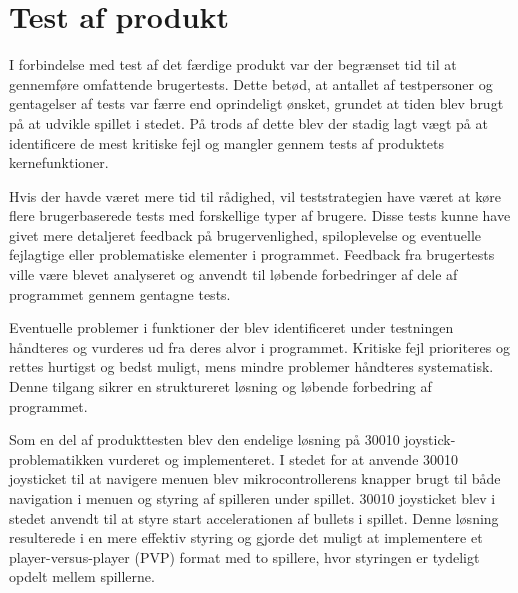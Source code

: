 \section{Test af produkt}
\vspace{0.5em}
I forbindelse med test af det færdige produkt var der begrænset tid til at gennemføre omfattende brugertests. Dette betød, at antallet af testpersoner og gentagelser af tests var færre end oprindeligt ønsket, grundet at tiden blev brugt på at udvikle spillet i stedet. På trods af dette blev der stadig lagt vægt på at identificere de mest kritiske fejl og mangler gennem tests af produktets kernefunktioner.

Hvis der havde været mere tid til rådighed, vil teststrategien have været at køre flere brugerbaserede tests med forskellige typer af brugere. Disse tests kunne have givet mere detaljeret feedback på brugervenlighed, spiloplevelse og eventuelle fejlagtige eller problematiske elementer i programmet. Feedback fra brugertests ville være blevet analyseret og anvendt til løbende forbedringer af dele af programmet gennem gentagne tests.

Eventuelle problemer i funktioner der blev identificeret under testningen håndteres og vurderes ud fra deres alvor i programmet. Kritiske fejl prioriteres og rettes hurtigst og bedst muligt, mens mindre problemer håndteres systematisk. Denne tilgang sikrer en struktureret løsning og løbende forbedring af programmet.

Som en del af produkttesten blev den endelige løsning på 30010 joystick-problematikken vurderet og implementeret. I stedet for at anvende 30010 joysticket til at navigere menuen blev mikrocontrollerens knapper brugt til både navigation i menuen og styring af spilleren under spillet. 30010 joysticket blev i stedet anvendt til at styre start accelerationen af bullets i spillet. Denne løsning resulterede i en mere effektiv styring og gjorde det muligt at implementere et player-versus-player (PVP) format med to spillere, hvor styringen er tydeligt opdelt mellem spillerne.